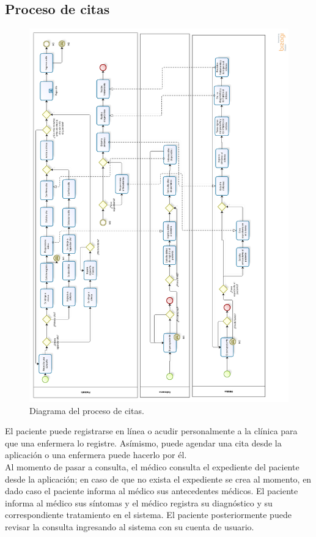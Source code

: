 \subsection{Proceso de citas}
\begin{figure}[htbp!]
		\centering
			\includegraphics[width=1\textwidth]{images/procesos/consultas_new}
		\caption{Diagrama del proceso de citas.}
	\end{figure}
El paciente puede registrarse en línea o acudir personalmente a la clínica para que una enfermera lo registre. Asímismo, puede agendar una cita desde la aplicación o una enfermera puede hacerlo por él.\\
Al momento de pasar a consulta, el médico consulta el expediente del paciente desde la aplicación; en caso de que no exista el expediente se crea al momento, en dado caso el paciente informa al médico sus antecedentes médicos. El paciente informa al médico sus síntomas y el médico registra su diagnóstico y su correspondiente tratamiento en el sistema. El paciente posteriormente puede revisar la consulta ingresando al sistema con su cuenta de usuario.

